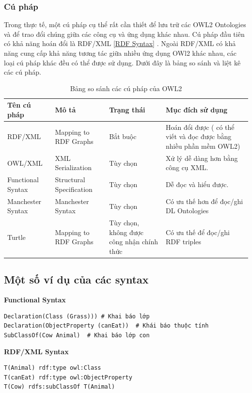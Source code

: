 \subsubsection{Cú pháp}
Trong thực tế, một cú pháp cụ thể rất cần thiết để lưu trữ các OWL2 Ontologies và để trao đổi chúng giữa các công cụ và ứng dụng khác nhau. Cú pháp đầu tiên có khả năng hoán đổi là RDF/XML [\href{http://www.w3.org/TR/owl2-overview/#ref-rdf-syntax}{RDF Syntax}] \cite{rdfxml}. Ngoài RDF/XML có khả năng cung cấp khả năng tương tác giữa nhiều ứng dụng OWl2 khác nhau, các loại cú pháp khác đều có thể được sử dụng. Dưới đây là bảng so sánh và liệt kê các cú pháp.
\begin{table}[H]
	\begin{tabular}{ |p{3cm}|p{4cm}|p{2cm}|p{4cm}|}
		\hline
		Tên cú pháp & Mô tả & Trạng thái & Mục đích sử dụng\\
		\hline
		RDF/XML & Mapping to RDF Graphs \cite{mapping_rdf_graph} \cite{rdfxml} & Bắt buộc & Hoán đổi được ( có thể viết và đọc được bằng nhiều phần mềm OWL2)
		\\
		\hline
		OWL/XML & XML Serialization \cite{owlxml} & Tùy chọn & Xử lý dễ dàng hơn bằng công cụ XML.
		\\
		\hline
		Functional Syntax & Structural Specification \cite{func_syntax} & Tùy chọn & Dễ đọc và hiểu được.
		\\
		\hline
		Manchester Syntax & Manchester Syntax \cite{man_syntax} & Tùy chọn & Có ưu thế hơn để đọc/ghi DL Ontologies
		\\
		\hline
		Turtle & Mapping to RDF Graphs \cite{mapping_rdf_graph} & Tùy chọn, không được công nhận chính thức & Có ưu thế để đọc/ghi RDF triples
		\\
		\hline
	\end{tabular}
	\caption{Bảng so sánh các cú pháp của OWL2\label{overflow}}
\end{table}
\subsection{Một số ví dụ của các syntax}

\textbf{Functional Syntax}
\begin{verbatim}
Declaration(Class (Grass))) # Khai báo lớp
Declaration(ObjectProperty (canEat))  # Khái báo thuộc tính
SubClassOf(Cow Animal)  # Khai báo lớp con
\end{verbatim}

\textbf{RDF/XML Syntax}
\begin{verbatim}
T(Animal) rdf:type owl:Class
T(canEat) rdf:type owl:ObjectProperty
T(Cow) rdfs:subClassOf T(Animal) 
\end{verbatim}


